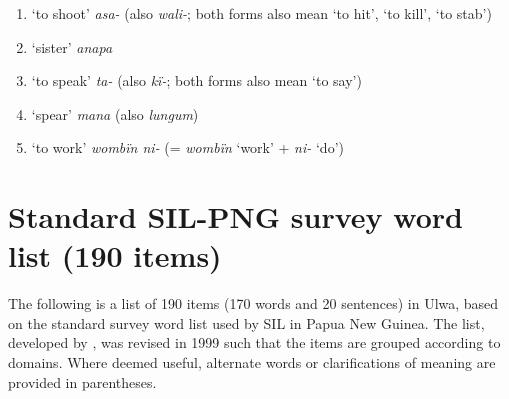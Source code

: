 \begin{enumerate}[noitemsep, label={\arabic*}, align=left, widest=190, labelsep=1ex,leftmargin=*]
\item ‘to shoot’ \textit{asa-} (also \textit{wali-}; both forms also mean ‘to hit’, ‘to kill’, ‘to stab’)

\item ‘sister’ \textit{anapa}

\item ‘to speak’ \textit{ta-} (also \textit{kï-}; both forms also mean ‘to say’)

\item ‘spear’ \textit{mana} (also \textit{lungum})

\item ‘to work’ \textit{wombïn ni-} (= \textit{wombïn} ‘work’ + \textit{ni-} ‘do’)
\end{enumerate}


\chapter{Standard SIL-PNG survey word list (190 items)}\label{sec:app.c}


The following is a list of 190 items (170 words and 20 sentences) in Ulwa, based on the standard survey word list used by SIL in Papua New Guinea. The list, developed by \citet{BeePence1962}, was revised in 1999 such that the items are grouped according to  domains. Where deemed useful, alternate words or clarifications of meaning are provided in parentheses.

